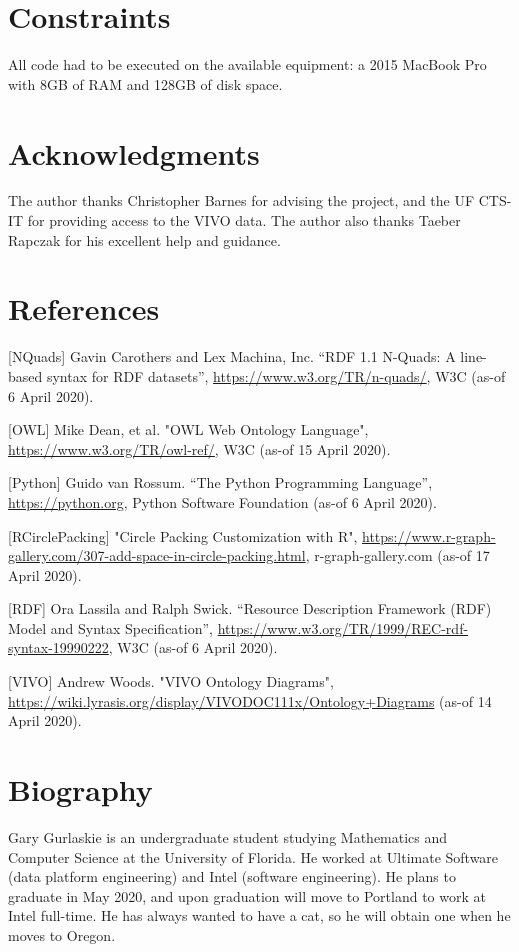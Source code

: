 \documentclass[11pt]{article}
\begin{document}
\section*{Constraints}
All code had to be executed on the available equipment: a 2015 MacBook Pro with 8GB of RAM and 128GB of disk space. 

% 

\section*{Acknowledgments}
The author thanks Christopher Barnes for advising the project, and the UF CTS-IT for providing access to the VIVO data. The author also thanks Taeber Rapczak for his excellent help and guidance.

\section*{References}

[NQuads] Gavin Carothers and Lex Machina, Inc. “RDF 1.1 N-Quads: A line-based syntax for RDF datasets”, \url{https://www.w3.org/TR/n-quads/}, W3C (as-of 6 April 2020).

[OWL] Mike Dean, et al. "OWL Web Ontology Language", \url{https://www.w3.org/TR/owl-ref/}, W3C (as-of 15 April 2020).

[Python] Guido van Rossum. “The Python Programming Language”, \url{https://python.org}, Python Software Foundation (as-of 6 April 2020).

[RCirclePacking] "Circle Packing Customization with R", \url{https://www.r-graph-gallery.com/307-add-space-in-circle-packing.html}, r-graph-gallery.com (as-of 17 April 2020).

[RDF] Ora Lassila and Ralph Swick. “Resource Description Framework (RDF) Model and Syntax Specification”, \url{https://www.w3.org/TR/1999/REC-rdf-syntax-19990222}, W3C (as-of 6 April 2020).

[VIVO] Andrew Woods. "VIVO Ontology Diagrams", \url{https://wiki.lyrasis.org/display/VIVODOC111x/Ontology+Diagrams} (as-of 14 April 2020).

\section*{Biography}
Gary Gurlaskie is an undergraduate student studying Mathematics and Computer Science at the University of Florida. He worked at Ultimate Software (data platform engineering) and Intel (software engineering). He plans to graduate in May 2020, and upon graduation will move to Portland to work at Intel full-time. He has always wanted to have a cat, so he will obtain one when he moves to Oregon.
\end{document}
